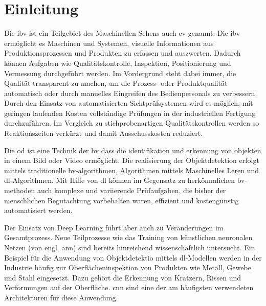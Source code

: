 


\chapter{Einleitung}\label{sec:exp_einleitung}

Die \gls{ibv} ist ein Teilgebiet des Maschinellen Sehens  auch \gls{cv} genannt. Die \gls{ibv} ermöglicht es Maschinen und Systemen, visuelle Informationen aus Produktionsprozessen und Produkten zu erfassen und auszwerten. Dadurch können Aufgaben wie Qualitätskontrolle, Inspektion, Positionierung und Vermessung durchgeführt werden. Im Vordergrund steht dabei immer, die Qualität transparent zu machen, um die Prozess- oder Produktqualität automatisch oder durch manuelles Eingreifen des Bedienpersonals zu verbessern. Durch den Einsatz von automatisierten Sichtprüfsystemen wird es möglich, mit geringen laufenden Kosten vollständige Prüfungen in der industriellen Fertigung durchzuführen. Im Vergleich zu stichprobenartigen Qualitätskontrollen werden so Reaktionszeiten verkürzt und damit Ausschusskosten reduziert.\citep{cognex_grundlagen_nodate} 

Die \gls{od} ist eine Technik der \gls{bv} dass die identifikation und erkennung von objekten in einem Bild oder Video ermöglicht. Die realisierung der Objektdetektion erfolgt mittels traditionelle \gls{bv}-algorithmen, Algorithmen mittels Maschinelles Leren und \gls{dl}-Algorithmen. Mit Hilfe von \gls{dl} können im Gegensatz zu herkömmlichen \gls{bv}-methoden auch komplexe und variierende Prüfaufgaben, die bisher der menschlichen Begutachtung vorbehalten waren, effizient und kostengünstig automatisiert werden.\cite{kaur_systematic_2024}

Der Einsatz von Deep Learning führt aber auch zu Veränderungen im Gesamtprozess. Neue Teilprozesse wie das Training von künstlichen neuronalen Netzen (von engl. \gls{ann}) sind bereits hinreichend wissenschaftlich untersucht. Ein Beispiel für die Anwendung von Objektdetektio mittels \gls{dl}-Modellen werden in der Industrie häufig zur Oberflächeninspektion von Produkten wie Metall, Gewebe und Stahl eingesetzt. Dazu gehört die Erkennung von Kratzern, Rissen und Verformungen auf der Oberfläche. \gls{cnn} sind eine der am häufigsten verwendeten Architekturen für diese Anwendung.\citep{saberironaghi_defect_2023}

